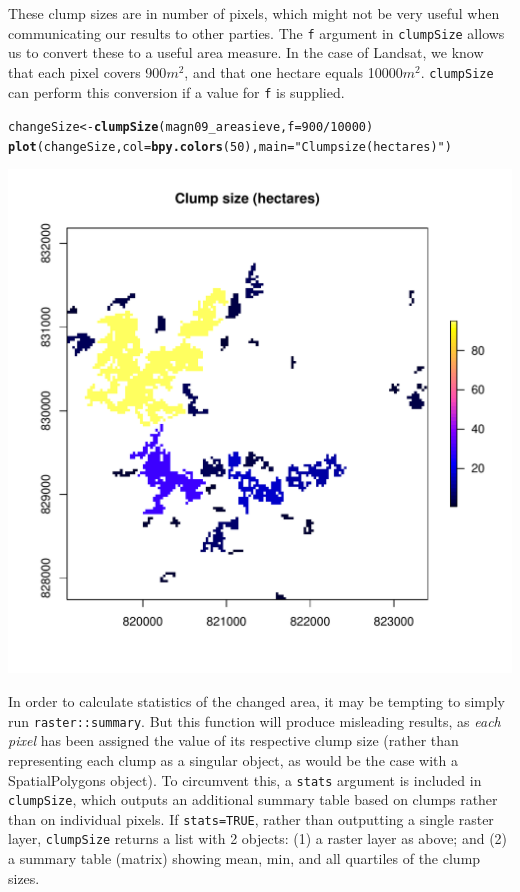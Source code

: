 \documentclass{article}\usepackage[]{graphicx}\usepackage[]{color}
\makeatletter
\def\maxwidth{ %
  \ifdim\Gin@nat@width>\linewidth
    \linewidth
  \else
    \Gin@nat@width
  \fi
}
\newcommand{\hlnum}[1]{\textcolor[rgb]{0.686,0.059,0.569}{#1}}%
\newcommand{\hlstr}[1]{\textcolor[rgb]{0.192,0.494,0.8}{#1}}%
\newcommand{\hlopt}[1]{\textcolor[rgb]{0,0,0}{#1}}%
\newcommand{\hlstd}[1]{\textcolor[rgb]{0.345,0.345,0.345}{#1}}%
\newcommand{\hlkwb}[1]{\textcolor[rgb]{0.69,0.353,0.396}{#1}}%
\newcommand{\hlkwc}[1]{\textcolor[rgb]{0.333,0.667,0.333}{#1}}%
\newcommand{\hlkwd}[1]{\textcolor[rgb]{0.737,0.353,0.396}{\textbf{#1}}}%
\newenvironment{kframe}{%
 \def\at@end@of@kframe{}%
 \ifinner\ifhmode%
  \def\at@end@of@kframe{\end{minipage}}%
  \begin{minipage}{\columnwidth}%
 \fi\fi%
 \def\FrameCommand##1{\hskip\@totalleftmargin \hskip-\fboxsep
 \colorbox{shadecolor}{##1}\hskip-\fboxsep
     \hskip-\linewidth \hskip-\@totalleftmargin \hskip\columnwidth}%
 \MakeFramed {\advance\hsize-\width
   \@totalleftmargin\z@ \linewidth\hsize
   \@setminipage}}%
 {\par\unskip\endMakeFramed%
 \at@end@of@kframe}
\newenvironment{knitrout}{}{} %
\def\code#1{\texttt{#1}}
\makeatother
\begin{document}
These clump sizes are in number of pixels, which might not be very useful when communicating our results to other parties. The \code{f} argument in \code{clumpSize} allows us to convert these to a useful area measure. In the case of Landsat, we know that each pixel covers 900$m^2$, and that one hectare equals 10000$m^2$. \code{clumpSize} can perform this conversion if a value for \code{f} is supplied.

\begin{knitrout}
\color{fgcolor}\begin{kframe}
\begin{alltt}
\hlstd{changeSize} \hlkwb{<-} \hlkwd{clumpSize}\hlstd{(magn09_areasieve,} \hlkwc{f} \hlstd{=} \hlnum{900}\hlopt{/}\hlnum{10000}\hlstd{)}
\hlkwd{plot}\hlstd{(changeSize,} \hlkwc{col} \hlstd{=} \hlkwd{bpy.colors}\hlstd{(}\hlnum{50}\hlstd{),} \hlkwc{main} \hlstd{=} \hlstr{"Clump size (hectares)"}\hlstd{)}
\end{alltt}
\end{kframe}
\includegraphics[width=\maxwidth]{figure/clumpSize-ha} 

\end{knitrout}


In order to calculate statistics of the changed area, it may be tempting to simply run \code{raster::summary}. But this function will produce misleading results, as \emph{each pixel} has been assigned the value of its respective clump size (rather than representing each clump as a singular object, as would be the case with a SpatialPolygons object). To circumvent this, a \code{stats} argument is included in \code{clumpSize}, which outputs an additional summary table based on clumps rather than on individual pixels. If \code{stats=TRUE}, rather than outputting a single raster layer, \code{clumpSize} returns a list with 2 objects: (1) a raster layer as above; and (2) a summary table (matrix) showing mean, min, and all quartiles of the clump sizes.
\end{document}
